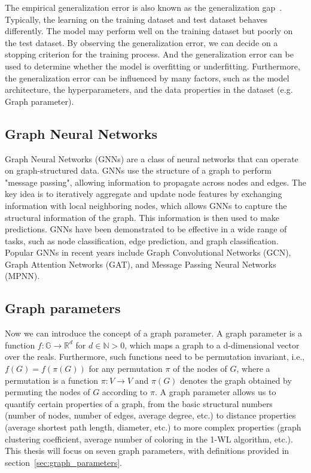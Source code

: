 \documentclass{article}
\begin{document}
The empirical generalization error is also known as the generalization gap~\cite{goodfellow2016deep}. Typically, the learning on the training dataset and test dataset behaves differently. The model may perform well on the training dataset but poorly on the test dataset. By observing the generalization error, we can decide on a stopping criterion for the training process. And the generalization error can be used to determine whether the model is overfitting or underfitting. Furthermore, the generalization error can be influenced by many factors, such as the model architecture, the hyperparameters, and the data properties in the dataset (e.g. Graph parameter). 

\subsection{Graph Neural Networks}
Graph Neural Networks (GNNs) are a class of neural networks that can operate on graph-structured data. GNNs use the structure of a graph to perform "message passing", allowing information to propagate across nodes and edges. The key idea is to iteratively aggregate and update node features by exchanging information with local neighboring nodes, which allows GNNs to capture the structural information of the graph. This information is then used to make predictions. GNNs have been demonstrated to be effective in a wide range of tasks, such as node classification, edge prediction, and graph classification. Popular GNNs in recent years include Graph Convolutional Networks (GCN), Graph Attention Networks (GAT), and Message Passing Neural Networks (MPNN).

\subsection{Graph parameters}
Now we can introduce the concept of a graph parameter. A graph parameter is a function $f: \mathbb{G} \rightarrow \mathbb{R}^d$ for $d\in \mathbb{N} >0$, which maps a graph to a d-dimensional vector over the reals. Furthermore, such functions need to be permutation invariant, i.e., $f(G) = f(\pi(G))$ for any permutation $\pi$ of the nodes of $G$, where a permutation is a function $\pi: V \rightarrow V$ and $\pi(G)$ denotes the graph obtained by permuting the nodes of $G$ according to $\pi$. A graph parameter allows us to quantify certain properties of a graph, from the basic structural numbers (number of nodes, number of edges, average degree, etc.) to distance properties (average shortest path length, diameter, etc.) to more complex properties (graph clustering coefficient, average number of coloring in the 1-WL algorithm, etc.). This thesis will focus on seven graph parameters, with definitions provided in section~\ref{sec:graph_parameters}.
\end{document}
